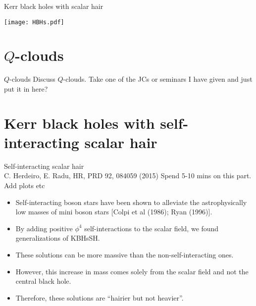 \documentclass[xcolor=dvipsnames]{beamer}
\begin{document}
\begin{frame}{Kerr black holes with scalar hair}
  \begin{center}
    \texttt{[image: HBHs.pdf]}
  \end{center}
\end{frame}

\section{$Q$-clouds}

\begin{frame}{$Q$-clouds}
  Discuss $Q$-clouds. Take one of the JCs or seminars I have given and just put it in here?
\end{frame}

\section{Kerr black holes with self-interacting scalar hair}
\begin{frame}
  \tableofcontents[currentsubsection]
\end{frame}
\begin{frame}{Self-interacting scalar hair \\\tiny{C. Herdeiro, E. Radu, HR, PRD 92, 084059 (2015)}}
  Spend 5-10 mins on this part. Add plots etc
  \begin{itemize}[<+->]
    \item Self-interacting boson stars have been shown to alleviate the astrophysically low masses of mini boson stars \tiny{[Colpi et al (1986); Ryan (1996)]}.
    \item By adding positive $\phi^4$ self-interactions to the scalar field, we found generalizations of KBHsSH.
    \item These solutions can be more massive than the non-self-interacting ones.
    \item However, this increase in mass comes solely from the scalar field and not the central black hole.
    \item Therefore, these solutions are ``hairier but not heavier''.
  \end{itemize}
\end{frame}
\end{document}
